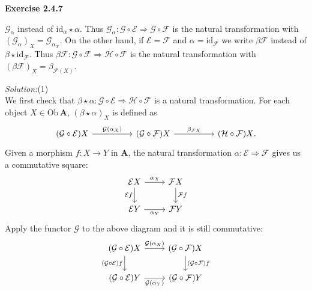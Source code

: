 \documentclass[a4paper, 12pt]{article}
\newenvironment{problem}[2][Exercise]
    { \begin{mdframed}[backgroundcolor=gray!20] \textbf{#1 #2} \\}
    {  \end{mdframed}}
\newenvironment{solution}
    {\textit{Solution:}}
    {}
\begin{document}
\begin{problem}{2.4.7}
\begin{enumerate}
         \(\mathcal{G}_{\alpha}\) instead of \(\text{id}_{\alpha}\star \alpha\). Thus \(\mathcal{G}_\alpha:\mathcal{G}\circ \mathcal{E}\Rightarrow \mathcal{G}\circ \mathcal{F}\) is 
         the natural transformation with \((\mathcal{G}_\alpha)_X=\mathcal{G}_{\alpha_X}\). On the other hand, if \(\mathcal{E}=\mathcal{F}\) and \(\alpha=\text{id}_{\mathcal{F}}\) we write 
         \(\beta \mathcal{F}\) instead of \(\beta \star \text{id}_{\mathcal{F}}\). Thus \(\beta \mathcal{F}:\mathcal{G}\circ \mathcal{F}\Rightarrow \mathcal{H}\circ \mathcal{F}\) is the 
         natural transformation with \((\beta \mathcal{F})_X=\beta_{\mathcal{F}(X)}\).
\end{enumerate}
\end{problem}
\begin{solution}(1)\\ 
We first check that \(\beta\star \alpha:\mathcal{G}\circ \mathcal{E}\Rightarrow \mathcal{H}\circ \mathcal{F}\) is a natural transformation. For each object \(X\in \text{Ob}\, \mathbf{A}\), 
\((\beta\star \alpha)_X\) is defined as 
$$\begin{tikzcd}
	{(\mathcal{G}\circ \mathcal{E})X} && {(\mathcal{G}\circ \mathcal{F})X} && {(\mathcal{H}\circ \mathcal{F})X}.
	\arrow["{\mathcal{G}(\alpha_X)}", from=1-1, to=1-3]
	\arrow["{\beta_{\mathcal{F}X}}", from=1-3, to=1-5]
\end{tikzcd}$$
Given a morphism \(f:X\rightarrow Y\) in \(\mathbf{A}\), the natural transformation \(\alpha:\mathcal{E}\Rightarrow \mathcal{F}\) gives us a commutative square:
$$\begin{tikzcd}
	{\mathcal{E}X} & {\mathcal{F}X} \\
	{\mathcal{E}Y} & {\mathcal{F}Y}
	\arrow["{\alpha_X}", from=1-1, to=1-2]
	\arrow["{\mathcal{E}f}"', from=1-1, to=2-1]
	\arrow["{\mathcal{F}f}", from=1-2, to=2-2]
	\arrow["{\alpha_Y}"', from=2-1, to=2-2]
\end{tikzcd}$$
Apply the functor \(\mathcal{G}\) to the above diagram and it is still commutative:
\begin{equation}
\begin{tikzcd}
	{(\mathcal{G}\circ\mathcal{E})X} & {(\mathcal{G}\circ\mathcal{F})X} \\
	{(\mathcal{G}\circ\mathcal{E})Y} & {(\mathcal{G}\circ\mathcal{F})Y}
	\arrow["{\mathcal{G}(\alpha_X)}", from=1-1, to=1-2]
	\arrow["{(\mathcal{G}\circ\mathcal{E})f}"', from=1-1, to=2-1]
	\arrow["{(\mathcal{G}\circ\mathcal{F})f}", from=1-2, to=2-2]
	\arrow["{\mathcal{G}(\alpha_Y)}"', from=2-1, to=2-2]
\end{tikzcd}

\end{equation}
\end{solution}
\end{document}
